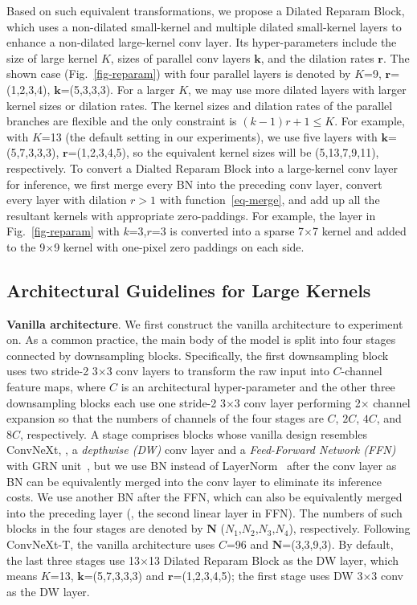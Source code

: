 \documentclass[10pt,twocolumn,letterpaper]{article}
\begin{document}
Based on such equivalent transformations, we propose a Dilated Reparam Block, which uses a non-dilated small-kernel and multiple dilated small-kernel layers to enhance a non-dilated large-kernel conv layer. Its hyper-parameters include the size of large kernel $K$, sizes of parallel conv layers $\bm{k}$, and the dilation rates $\bm{r}$. The shown case (Fig.~\ref{fig-reparam}) with four parallel layers is denoted by $K$=9, $\bm{r}$=(1,2,3,4), $\bm{k}$=(5,3,3,3). For a larger $K$, we may use more dilated layers with larger kernel sizes or dilation rates. The kernel sizes and dilation rates of the parallel branches are flexible and the only constraint is $(k-1)r+1 \leq K$. For example, with $K$=13 (the default setting in our experiments), we use five layers with $\bm{k}$=(5,7,3,3,3), $\bm{r}$=(1,2,3,4,5), so the equivalent kernel sizes will be (5,13,7,9,11), respectively. To convert a Dialted Reparam Block into a large-kernel conv layer for inference, we first merge every BN into the preceding conv layer, convert every layer with dilation $r>1$ with function~\ref{eq-merge}, and add up all the resultant kernels with appropriate zero-paddings. For example, the layer in Fig.~\ref{fig-reparam} with $k$=3,$r$=3 is converted into a sparse 7$\times$7 kernel and added to the 9$\times$9 kernel with one-pixel zero paddings on each side. 



\subsection{Architectural Guidelines for Large Kernels}\label{sec-guidelines}

\textbf{Vanilla architecture}. We first construct the vanilla architecture to experiment on. As a common practice, the main body of the model is split into four stages connected by downsampling blocks. Specifically, the first downsampling block uses two stride-2 3$\times$3 conv layers to transform the raw input into $C$-channel feature maps, where $C$ is an architectural hyper-parameter and the other three downsampling blocks each use one stride-2 3$\times$3 conv layer performing 2$\times$ channel expansion so that the numbers of channels of the four stages are $C$, $2C$, $4C$, and $8C$, respectively. A stage comprises blocks whose vanilla design resembles ConvNeXt, \ie, a \emph{depthwise (DW)} conv layer and a \emph{Feed-Forward Network (FFN)} with GRN unit~\cite{woo2023convnext}, but we use BN instead of LayerNorm~\cite{ba2016layer} after the conv layer as BN can be equivalently merged into the conv layer to eliminate its inference costs. We use another BN after the FFN, which can also be equivalently merged into the preceding layer (\ie, the second linear layer in FFN). The numbers of such blocks in the four stages are denoted by $\bm{N}$ ($N_1$,$N_2$,$N_3$,$N_4$), respectively. Following ConvNeXt-T, the vanilla architecture uses $C$=96 and $\bm{N}$=(3,3,9,3). By default, the last three stages use 13$\times$13 Dilated Reparam Block as the DW layer, which means $K$=13, $\bm{k}$=(5,7,3,3,3) and $\bm{r}$=(1,2,3,4,5); the first stage uses DW 3$\times$3 conv as the DW layer.
\end{document}
